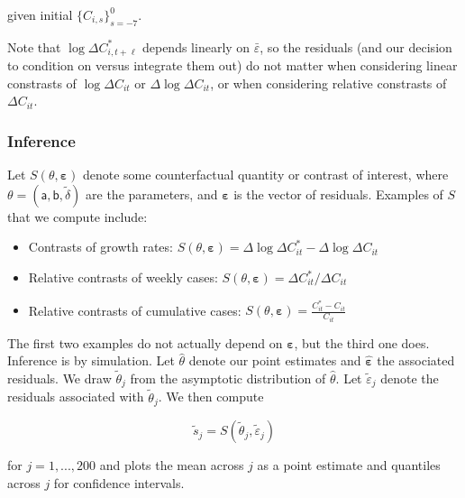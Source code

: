 \documentclass[11pt,reqno,letter]{amsart}
\theoremstyle{definition}
\begin{document}
given initial $\{C_{i,s}\}_{s=-7}^0$.

Note that $\log \Delta C_{i,t+\ell}^*$ depends linearly on
$\bar \varepsilon$, so the residuals (and our decision to condition on
versus integrate them out) do not matter when considering linear
constrasts of $\log \Delta C_{it}$ or $\Delta \log \Delta C_{it}$, or
when considering relative constrasts of $\Delta C_{it}$.


\subsubsection*{Inference}

Let $S(\theta, \mathbf{\varepsilon})$ denote some counterfactual
quantity or contrast of interest, where $\theta = (\mathsf{a},
\mathsf{b}, \tilde{\delta})$ are the parameters, and
$\mathbf{\varepsilon}$ is the vector of residuals. Examples of $S$
that we compute include:

\begin{itemize}
\item Contrasts of growth rates: $S(\theta, \mathbf{\varepsilon}) =
  \Delta \log \Delta C_{it}^* - \Delta \log \Delta C_{it}$

\item Relative contrasts of weekly cases: $S(\theta, \mathbf{\varepsilon}) =
  \Delta C_{it}^*/\Delta C_{it}$

\item Relative contrasts of cumulative cases: $S(\theta, \mathbf{\varepsilon}) =
  \frac{C_{it}^* - C_{it}}{C_{it}}$
\end{itemize}

The first two examples do not actually depend on
$\mathbf{\varepsilon}$, but the third one does. Inference is by
simulation. Let $\hat{\theta}$ denote our point estimates and
$\hat{\mathbf{\varepsilon}}$ the associated residuals. We draw
$\tilde{\theta}_j$ from the asymptotic distribution of
$\hat{\theta}$. Let $\tilde{\varepsilon}_j$ denote the
residuals associated with $\tilde{\theta}_j$. We then compute

$$ \tilde{s}_j = S(\tilde{\theta}_j, \tilde{\varepsilon}_j) $$

for $j=1,..., 200$ and plots the mean across $j$ as a point estimate
and quantiles across $j$ for confidence intervals.
\end{document}
